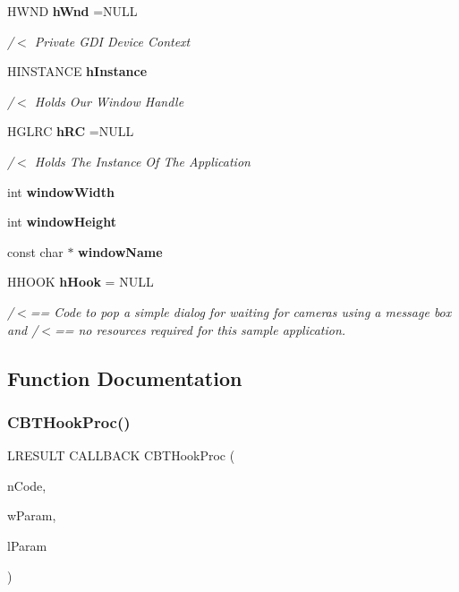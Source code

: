 \begin{DoxyCompactItemize}
H\+W\+ND \textbf{ h\+Wnd} =N\+U\+LL
\begin{DoxyCompactList}\small\item\em /$<$ Private G\+DI Device Context \end{DoxyCompactList}\item 
H\+I\+N\+S\+T\+A\+N\+CE \textbf{ h\+Instance}
\begin{DoxyCompactList}\small\item\em /$<$ Holds Our Window Handle \end{DoxyCompactList}\item 
H\+G\+L\+RC \textbf{ h\+RC} =N\+U\+LL
\begin{DoxyCompactList}\small\item\em /$<$ Holds The Instance Of The Application \end{DoxyCompactList}\item 
int \textbf{ window\+Width}
\item 
int \textbf{ window\+Height}
\item 
const char $\ast$ \textbf{ window\+Name}
\item 
H\+H\+O\+OK \textbf{ h\+Hook} = N\+U\+LL
\begin{DoxyCompactList}\small\item\em /$<$== Code to pop a simple dialog for \textquotesingle{}waiting for cameras\textquotesingle{} using a message box and /$<$== no resources required for this sample application. \end{DoxyCompactList}\end{DoxyCompactItemize}


\subsection{Function Documentation}
\mbox{\label{supportcode_8cpp_a17f99e323714d00ed14865018691574c}} 
\subsubsection{C\+B\+T\+Hook\+Proc()}
{\footnotesize\ttfamily L\+R\+E\+S\+U\+LT C\+A\+L\+L\+B\+A\+CK C\+B\+T\+Hook\+Proc (\begin{DoxyParamCaption}\item[{int}]{n\+Code,  }\item[{W\+P\+A\+R\+AM}]{w\+Param,  }\item[{L\+P\+A\+R\+AM}]{l\+Param }\end{DoxyParamCaption})}

